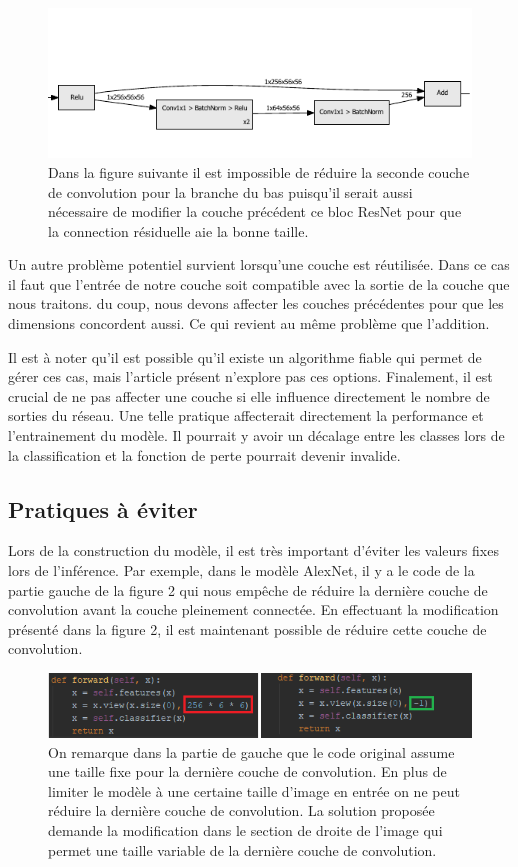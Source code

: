 \documentclass[12pt]{article}
\begin{document}
\begin{figure}[H]
	\centering
	\includegraphics{fig/residual_add}
	\caption{Dans la figure suivante il est impossible de réduire la seconde couche de convolution pour la branche du bas puisqu'il serait aussi nécessaire de modifier la couche précédent ce bloc ResNet pour que la connection résiduelle aie la bonne taille.}
	\label{fig:residualadd}
\end{figure}

Un autre problème potentiel survient lorsqu'une couche est réutilisée. Dans ce cas il faut que l'entrée de notre couche soit compatible avec la sortie de la couche que nous traitons. du coup, nous devons affecter les couches précédentes pour que les dimensions concordent aussi. Ce qui revient au même problème que l'addition.

Il est à noter qu'il est possible qu'il existe un algorithme fiable qui permet de gérer ces cas, mais l'article présent n'explore pas ces options.
Finalement, il est crucial de ne pas affecter une couche si elle influence directement le nombre de sorties du réseau. Une telle pratique affecterait directement la performance et l'entrainement du modèle. Il pourrait y avoir un décalage entre les classes lors de la classification et la fonction de perte pourrait devenir invalide.

\subsection{Pratiques à éviter}
Lors de la construction du modèle, il est très important d’éviter les valeurs fixes lors de l’inférence. Par exemple, dans le modèle AlexNet, il y a le code de la partie gauche de la figure 2 qui nous empêche de réduire la dernière couche de convolution avant la couche pleinement connectée. En effectuant la modification présenté dans la figure 2, il est maintenant possible de réduire cette couche de convolution. 
\begin{figure}[H]
	\centering
	\includegraphics{fig/mistake}
	\caption{On remarque dans la partie de gauche que le code original assume une taille fixe pour la dernière couche de convolution. En plus de limiter le modèle à une certaine taille d'image en entrée on ne peut réduire la dernière couche de convolution. La solution proposée demande la modification dans le section de droite de l'image qui permet une taille variable de la dernière couche de convolution.}
	\label{fig:mistake}
\end{figure}
\end{document}
